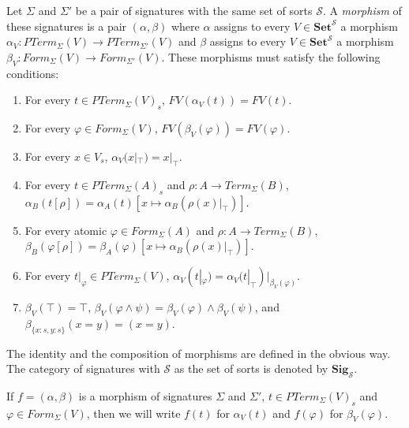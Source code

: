 \documentclass{amsart}
\theoremstyle{definition}
\theoremstyle{remark}
\newcommand{\cat}[1]{\mathbf{#1}}
\newcommand{\Set}{\cat{Set}}
\newcommand{\Sig}{\cat{Sig}}
\numberwithin{figure}{section}
\begin{document}
\begin{defn}
Let $\Sigma$ and $\Sigma'$ be a pair of signatures with the same set of sorts $\mathcal{S}$.
A \emph{morphism} of these signatures is a pair $(\alpha,\beta)$ where $\alpha$ assigns to every $V \in \Set^\mathcal{S}$ a morphism $\alpha_V : PTerm_\Sigma(V) \to PTerm_{\Sigma'}(V)$
and $\beta$ assigns to every $V \in \Set^\mathcal{S}$ a morphism $\beta_V : Form_\Sigma(V) \to Form_{\Sigma'}(V)$.
These morphisms must satisfy the following conditions:
\begin{enumerate}
\item For every $t \in PTerm_\Sigma(V)_s$, $FV(\alpha_V(t)) = FV(t)$.
\label{mor-sig-a-fv}
\item For every $\varphi \in Form_\Sigma(V)$, $FV(\beta_V(\varphi)) = FV(\varphi)$.
\label{mor-sig-b-fv}
\item For every $x \in V_s$, $\alpha_V(x|_\top) = x|_\top$.
\label{mor-sig-a-var}
\item For every $t \in PTerm_\Sigma(A)_s$ and $\rho : A \to Term_\Sigma(B)$, $\alpha_B(t[\rho]) = \alpha_A(t)[x \mapsto \alpha_B(\rho(x)|_\top)]$.
\label{mor-sig-a-subst}
\item For every atomic $\varphi \in Form_\Sigma(A)$ and $\rho : A \to Term_\Sigma(B)$, $\beta_B(\varphi[\rho]) = \beta_A(\varphi)[x \mapsto \alpha_B(\rho(x)|_\top)]$.
\label{mor-sig-b-subst}
\item For every $t|_\varphi \in PTerm_\Sigma(V)$, $\alpha_V(t|_\varphi) = \alpha_V(t|_\top)|_{\beta_V(\varphi)}$.
\label{mor-sig-a-op}
\item $\beta_V(\top) = \top$, $\beta_V(\varphi \land \psi) = \beta_V(\varphi) \land \beta_V(\psi)$, and $\beta_{\{ x : s, y : s \}}(x = y) = (x = y)$.
\label{mor-sig-b-op}
\end{enumerate}
The identity and the composition of morphisms are defined in the obvious way.
The category of signatures with $\mathcal{S}$ as the set of sorts is denoted by $\Sig_\mathcal{S}$.
\end{defn}

If $f = (\alpha,\beta)$ is a morphism of signatures $\Sigma$ and $\Sigma'$, $t \in PTerm_\Sigma(V)_s$ and $\varphi \in Form_\Sigma(V)$,
then we will write $f(t)$ for $\alpha_V(t)$ and $f(\varphi)$ for $\beta_V(\varphi)$.
\end{document}
